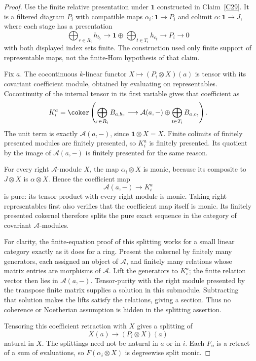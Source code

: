 \begin{proof}
Use the finite relative presentation under $\mathbf1$ constructed in Claim~\ref{C29}. It is a filtered diagram $P_i$ with compatible maps $\alpha_i:\mathbf1\to P_i$ and colimit $\alpha:\mathbf1\to J$, where each stage has a presentation
\[
 \bigoplus_{r\in R_i}h_{b_r}\longrightarrow
 \mathbf1\oplus\bigoplus_{t\in T_i}h_{c_t}\longrightarrow P_i\longrightarrow0
\]
with both displayed index sets finite. The construction used only finite support of representable maps, not the finite-Hom hypothesis of that claim.

Fix $a$. The cocontinuous $k$-linear functor $X\mapsto(P_i\otimes X)(a)$ is tensor with its covariant coefficient module, obtained by evaluating on representables. Cocontinuity of the internal tensor in its first variable gives that coefficient as
\[
 K_i^a=\coker\left(
 \bigoplus_{r\in R_i}B_{a,b_r}\longrightarrow
 \mathcal A(a,-)\oplus\bigoplus_{t\in T_i}B_{a,c_t}\right).
\]
The unit term is exactly $\mathcal A(a,-)$, since $\mathbf1\otimes X=X$. Finite colimits of finitely presented modules are finitely presented, so $K_i^a$ is finitely presented. Its quotient by the image of $\mathcal A(a,-)$ is finitely presented for the same reason.

For every right $\mathcal A$-module $X$, the map $\alpha_i\otimes X$ is monic, because its composite to $J\otimes X$ is $\alpha\otimes X$. Hence the coefficient map
\[
 \mathcal A(a,-)\longrightarrow K_i^a
\]
is pure: its tensor product with every right module is monic. Taking right representables first also verifies that the coefficient map itself is monic. Its finitely presented cokernel therefore splits the pure exact sequence in the category of covariant $\mathcal A$-modules.

For clarity, the finite-equation proof of this splitting works for a small linear category exactly as it does for a ring. Present the cokernel by finitely many generators, each assigned an object of $\mathcal A$, and finitely many relations whose matrix entries are morphisms of $\mathcal A$. Lift the generators to $K_i^a$; the finite relation vector then lies in $\mathcal A(a,-)$. Tensor-purity with the right module presented by the transpose finite matrix supplies a solution in this submodule. Subtracting that solution makes the lifts satisfy the relations, giving a section. Thus no coherence or Noetherian assumption is hidden in the splitting assertion.

Tensoring this coefficient retraction with $X$ gives a splitting of
\[
 X(a)\longrightarrow(P_i\otimes X)(a)
\]
natural in $X$. The splittings need not be natural in $a$ or in $i$. Each $F_n$ is a retract of a sum of evaluations, so $F(\alpha_i\otimes X)$ is degreewise split monic.


\end{proof}
